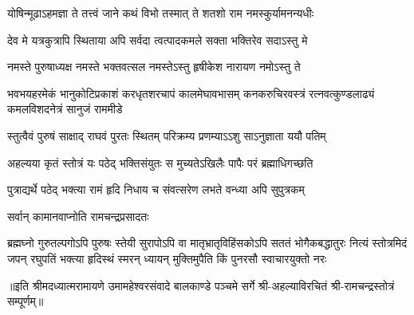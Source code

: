 \twolineshloka
{योषिन्मूढाऽहमज्ञा ते तत्त्वं जाने कथं विभो}
{तस्मात् ते शतशो राम नमस्कुर्यामनन्यधीः}%

\twolineshloka
{देव मे यत्रकुत्रापि स्थिताया अपि सर्वदा}
{त्वत्पादकमले सक्ता भक्तिरेव  सदाऽस्तु मे}%

\twolineshloka
{नमस्ते पुरुषाध्यक्ष नमस्ते भक्तवत्सल}
{नमस्तेऽस्तु हृषीकेश नारायण नमोऽस्तु ते}%

\fourlineindentedshloka
{भवभयहरमेकं भानुकोटिप्रकाशं}
{करधृतशरचापं कालमेघावभासम्}
{कनकरुचिरवस्त्रं रत्नवत्कुण्डलाढ्यं}
{कमलविशदनेत्रं सानुजं राममीडे}%

\twolineshloka
{स्तुत्वैवं पुरुषं साक्षाद् राघवं पुरतः स्थितम्}
{परिक्रम्य प्रणम्याऽऽशु साऽनुज्ञाता ययौ पतिम्}%

\twolineshloka
{अहल्यया कृतं स्तोत्रं यः पठेद् भक्तिसंयुतः}
{स मुच्यतेऽखिलैः पापैः परं ब्रह्माधिगच्छति}%

\twolineshloka
{पुत्राद्यर्थे पठेद् भक्त्या रामं हृदि निधाय च}
{संवत्सरेण लभते वन्ध्या अपि सुपुत्रकम्}%

\onelineshloka
{सर्वान् कामानवाप्नोति रामचन्द्रप्रसादतः}%

\fourlineindentedshloka
{ब्रह्मघ्नो गुरुतल्पगोऽपि पुरुषः स्तेयी सुरापोऽपि वा}
{मातृभ्रातृविहिंसकोऽपि सततं भोगैकबद्धातुरः}
{नित्यं स्तोत्रमिदं जपन्  रघुपतिं भक्त्या हृदिस्थं स्मरन्}
{ध्यायन् मुक्तिमुपैति किं पुनरसौ स्वाचारयुक्तो नरः}%

॥इति श्रीमदध्यात्मरामायणे उमामहेश्वरसंवादे बालकाण्डे
पञ्चमे  सर्गे श्री-अहल्याविरचितं श्री-रामचन्द्रस्तोत्रं सम्पूर्णम्॥
